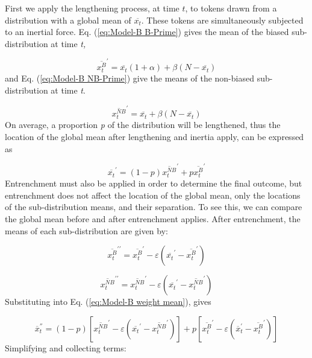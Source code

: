 First we apply the lengthening process, at time $t$, to tokens drawn
from a distribution with a global mean of $\overline{x_{t}}$. These
tokens are simultaneously subjected to an inertial force. Eq. (\ref{eq:Model-B B-Prime})
gives the mean of the biased sub-distribution at time \emph{t,}

\begin{equation}
\overline{x_{t}^{B}}^{\prime}=\overline{x_{t}}(1+\alpha)+\beta(N-\overline{x_{t}})\label{eq:Model-B B-Prime}
\end{equation}
and Eq. (\ref{eq:Model-B NB-Prime}) give the means of the non-biased
sub-distribution at time \emph{t}.

\begin{equation}
\overline{x_{t}^{NB}}^{\prime}=\overline{x_{t}}+\beta(N-\overline{x_{t}})\label{eq:Model-B NB-Prime}
\end{equation}
On average, a proportion \emph{p} of the distribution will be lengthened,
thus the location of the global mean after lengthening and inertia
apply, can be expressed as

\begin{equation}
\overline{x_{t}}^{\prime}=(1-p)\overline{x_{t}^{NB}}^{\prime}+p\overline{x_{t}^{B}}^{\prime}\label{eq:Model-B weight mean}
\end{equation}
Entrenchment must also be applied in order to determine the final
outcome, but entrenchment does not affect the location of the global
mean, only the locations of the sub-distribution means, and their
separation. To see this, we can compare the global mean before and
after entrenchment applies. After entrenchment, the means of each
sub-distribution are given by:

\begin{equation}
\overline{x_{t}^{B}}^{\prime\prime}=\overline{x_{t}^{B}}^{\prime}-\varepsilon(\overline{x_{t}}^{\prime}-\overline{x_{t}^{B}}^{\prime})
\end{equation}

\begin{equation}
\overline{x_{t}^{NB}}^{\prime\prime}=\overline{x_{t}^{NB}}^{\prime}-\varepsilon(\overline{x_{t}}^{\prime}-\overline{x_{t}^{NB}}^{\prime})
\end{equation}
Substituting into Eq. (\ref{eq:Model-B weight mean}), gives

\begin{equation}
\overline{x}_{t}^{''}=(1-p)[\overline{x_{t}^{NB}}^{\prime}-\varepsilon(\overline{x_{t}}^{\prime}-\overline{x_{t}^{NB}}^{\prime})]+p[\overline{x_{t}^{B}}^{\prime}-\varepsilon(\overline{x}_{t}^{\prime}-\overline{x_{t}^{B}}^{\prime})]
\end{equation}
Simplifying and collecting terms:

